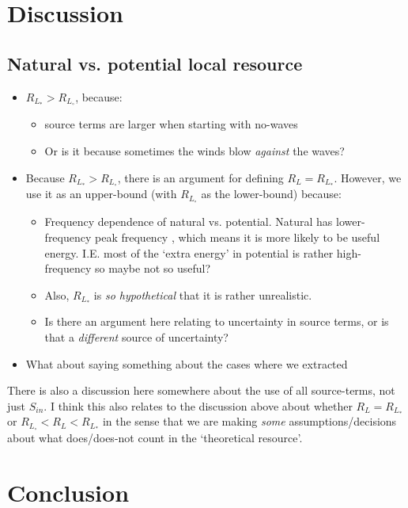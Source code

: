 
\section{Discussion} \label{sec:discussion}

\subsection{Natural vs. potential local resource}

\begin{itemize}
\item $R_{L_*} > R_{L_\circ}$, because:
  \begin{itemize}
  \item source terms are larger when starting with no-waves 
  \item Or is it because sometimes the winds blow {\em against} the waves?
  \end{itemize}
\item Because $R_{L_*} > R_{L_\circ}$, there is an argument for defining $R_L = R_{L_*}$. However, we use it as an upper-bound (with $R_{L_\circ}$ as the lower-bound) because:
  \begin{itemize}
  \item Frequency dependence of natural vs. potential. Natural has lower-frequency peak frequency , which means it is more likely to be useful energy. I.E. most of the `extra energy' in potential is rather high-frequency so maybe not so useful?
  \item Also, $R_{L_*}$ is {\em so hypothetical} that it is rather unrealistic.
  \item Is there an argument here relating to uncertainty in source terms, or is that a {\em different} source of uncertainty?
  \end{itemize}
\item What about saying something about the cases where we extracted 
\end{itemize}

There is also a discussion here somewhere about the use of all source-terms, not just $S_{in}$. I think this also relates to the discussion above about whether $R_L = R_{L_*}$ or $R_{L_\circ} < R_L < R_{L_*}$ in the sense that we are making {\em some} assumptions/decisions about what does/does-not count in the `theoretical resource'. 

\section{Conclusion} \label{sec:conclusion}


